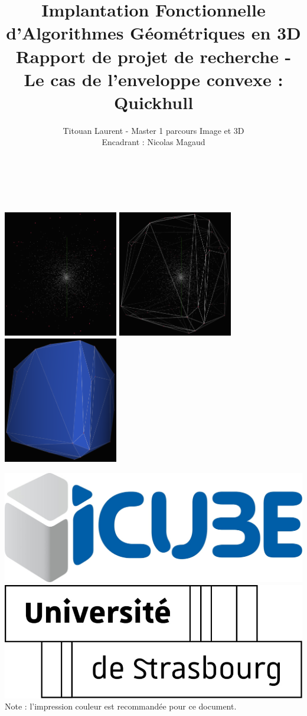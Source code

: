 \documentclass[]{article}
\title{Implantation Fonctionnelle \\ d'Algorithmes Géométriques en 3D \\[0.5cm]
  \large Rapport de projet de recherche - Le cas de l'enveloppe convexe : Quickhull}
\author{
	Titouan Laurent - Master 1 parcours Image et 3D\\
	Encadrant : Nicolas Magaud
}
\date{}
\begin{document}
\makeatletter
\begin{titlepage}
	\begin{center}
		{\huge \bfseries  \@title }\\[1cm]
		{\large  \@author}\\[2cm]
		\begin{center}
			\includegraphics[width=5cm]{illus/illus0.png}
			\includegraphics[width=5cm]{illus/illus1.png}
			\includegraphics[width=5cm]{illus/illus2.png}
			\\[8cm]
		\end{center}
		\includegraphics[width=0.15\linewidth]{logos/icube.jpg}
		\hspace{1cm}
		\includegraphics[width=0.2\linewidth]{logos/uds.jpg}
		\\[1cm]
		Note : l'impression couleur est recommandée pour ce document.
	\end{center}
\end{titlepage}
\makeatother
\end{document}
